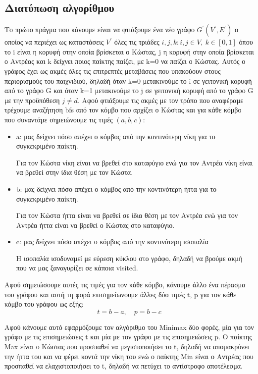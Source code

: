 \documentclass[a4paper,oneside, 11pt]{article}
\begin{document}
\subsection{Διατύπωση αλγορίθμου}
Το πρώτο πράγμα που κάνουμε είναι να φτιάξουμε ένα νέο γράφο $G^{'}(V^{'}, E^{'})$ ο οποίος να περιέχει ως καταστάσεις $V^{'}$ όλες τις τριάδες $i, j, k:i,j \in V, \ k \in [0,1]$ όπου το i είναι η κορυφή στην οποία βρίσκεται ο Κώστας, j η κορυφή στην οποία βρίσκεται ο Αντρέας και k δείχνει ποιος παίκτης παίζει, με k=0 να παίζει ο Κώστας. Αυτός ο γράφος έχει ως ακμές όλες τις επιτρεπτές μεταβάσεις που υπακούουν στους περιορισμούς του παιχνιδιού, δηλαδή όταν k=0 μετακινούμε το i σε γειτονική κορυφή από το γράφο G και όταν k=1 μετακινούμε το j σε γειτονική κορυφή από το γράφο G με την προϋπόθεση $j \neq d$. Αφού φτιάξουμε τις ακμές με τον τρόπο που αναφέραμε τρέχουμε αναζήτηση bfs από τον κόμβο που αρχίζει ο Κώστας και για κάθε κόμβο που συναντάμε σημειώνουμε τις τιμές $(a,b,c)$:
\begin{itemize}
\item a: μας δείχνει πόσο απέχει ο κόμβος από την κοντινότερη νίκη για το συγκεκριμένο παίκτη. \bigbreak 

Για τον Κώστα νίκη είναι να βρεθεί στο καταφύγιο ενώ για τον Αντρέα νίκη είναι να βρεθεί στην ίδια θέση με τον Κώστα.
\item b: μας δείχνει πόσο απέχει ο κόμβος από την κοντινότερη ήττα για το συγκεκριμένο παίκτη. \bigbreak

Για τον Κώστα ήττα είναι να βρεθεί σε ίδια θέση με τον Αντρέα ενώ για τον Αντρέα ήττα είναι να βρεθεί ο Κώστας στο καταφύγιο.
\item c: μας δείχνει πόσο απέχει ο κόμβος από την κοντινότερη ισοπαλία \bigbreak 

Η ισοπαλία ισοδυναμεί με εύρεση κύκλου στο γράφο, δηλαδή να βρούμε ακμή που να μας ξαναγυρίζει σε κάποια visited.
\end{itemize}
Αφού σημειώσουμε αυτές τις τιμές για τον κάθε κόμβο, κάνουμε άλλο ένα πέρασμα του γράφου και αυτή τη φορά επισημείωνουμε άλλες δύο τιμές t, p για τον κάθε κόμβο του γράφου ως εξής:
$$
t = b - a, \quad p = b - c
$$

Αφού κάνουμε αυτό εφαρμόζουμε τον αλγόριθμο του Minimax δύο φορές, μία για τον γράφο με τις επισημειώσεις t και μία με τον γράφο με τις επισημειώσεις p. Ο παίκτης Max είναι ο Κώστας που προσπαθεί να μεγιστοποιήσει το t, δηλαδή να απομακρύνει την ήττα του και να φέρει κοντά την νίκη του ενώ ο παίκτης Min είναι ο Αντρέας που προσπαθεί να ελαχιστοποιήσει το t, δηλαδή να πετύχει το αντίστροφο αποτέλεσμα. \bigbreak 
\end{document}
